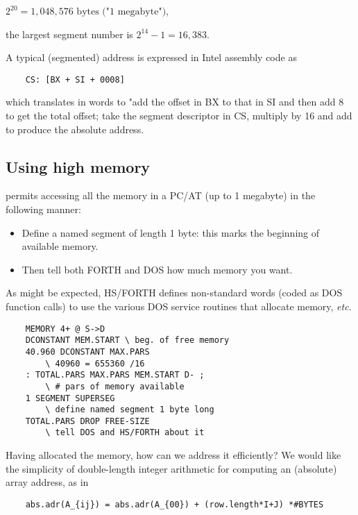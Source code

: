 \quad$2^{20} = 1,048,576 \textrm{ bytes ("1 megabyte")}$,

the largest segment number is $2^{14}-1 = 16,383$.

A typical (segmented) address is expressed in Intel assembly code
as

\begin{lstlisting}
    CS: [BX + SI + 0008]
\end{lstlisting}

which translates in words to "add the offset in BX to that in SI and then add 8 to get the total offset; take the segment descriptor in CS, multiply by 16 and add to produce the absolute address.

\subsection{Using high memory}
 permits accessing all the memory in a PC/AT (up
to 1 megabyte) in the following manner:
\begin{itemize}
    \item Define a named segment of length 1 byte: this marks the beginning of available memory.
    \item Then tell both FORTH and DOS how much memory you want.
\end{itemize} 

As might be expected, HS/FORTH defines non-standard words (coded as DOS function calls) to use the various DOS service routines that allocate memory, \textit{etc}.

\begin{lstlisting}
    MEMORY 4+ @ S->D
    DCONSTANT MEM.START \ beg. of free memory
    40.960 DCONSTANT MAX.PARS
        \ 40960 = 655360 /16
    : TOTAL.PARS MAX.PARS MEM.START D- ;
        \ # pars of memory available
    1 SEGMENT SUPERSEG
        \ define named segment 1 byte long
    TOTAL.PARS DROP FREE-SIZE
        \ tell DOS and HS/FORTH about it
\end{lstlisting}

Having allocated the memory, how can we address it efficiently? We would like the simplicity of double-length integer arithmetic for computing an (absolute) array address, as in

\begin{lstlisting}
    abs.adr(A_{ij}) = abs.adr(A_{00}) + (row.length*I+J) *#BYTES
\end{lstlisting}


